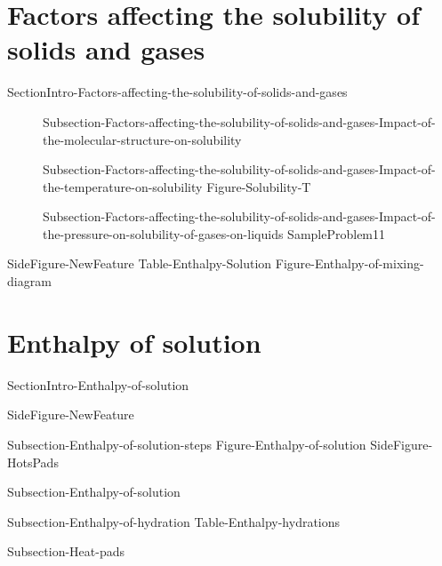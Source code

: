 \documentclass[main.tex]{subfiles}
\newcommand\chapterlabel{Ch-solutions}\setcounter{figurenewcounter}{0}\setcounter{tablenewcounter}{0}\setcounter{formulanewcounter}{0}\chapterpicture{../{\chapterlabel}/figure1}\chapterpicturelabel{PxFuel}
\begin{document}
\section{Factors affecting the solubility of solids and gases}{SectionIntro-Factors-affecting-the-solubility-of-solids-and-gases}
\sloppy \begin{description}
\item[] {Subsection-Factors-affecting-the-solubility-of-solids-and-gases-Impact-of-the-molecular-structure-on-solubility}
\item[] {Subsection-Factors-affecting-the-solubility-of-solids-and-gases-Impact-of-the-temperature-on-solubility}
{Figure-Solubility-T}
\item[] {Subsection-Factors-affecting-the-solubility-of-solids-and-gases-Impact-of-the-pressure-on-solubility-of-gases-on-liquids}
{SampleProblem11}
\end{description}




{SideFigure-NewFeature}
{Table-Enthalpy-Solution}
{Figure-Enthalpy-of-mixing-diagram }
\section{Enthalpy of solution}{SectionIntro-Enthalpy-of-solution}
\sloppy \begin{description}
{SideFigure-NewFeature}
\item[\docfilehook{Dissolution steps}{}] {Subsection-Enthalpy-of-solution-steps}
{Figure-Enthalpy-of-solution}
{SideFigure-HotsPads}

\item[\docfilehook{Enthalpy of solution}{}] {Subsection-Enthalpy-of-solution}
\item[\docfilehook{Enthalpy of hydration}{}] {Subsection-Enthalpy-of-hydration}
{Table-Enthalpy-hydrations}
\item[\docfilehook{Heat packs}{}] {Subsection-Heat-pads}
\end{description}


\checkoddpage\ifoddpage \clearpage\thispagestyle{empty}\mbox{}\clearpage \else  \fi 
\end{document}
